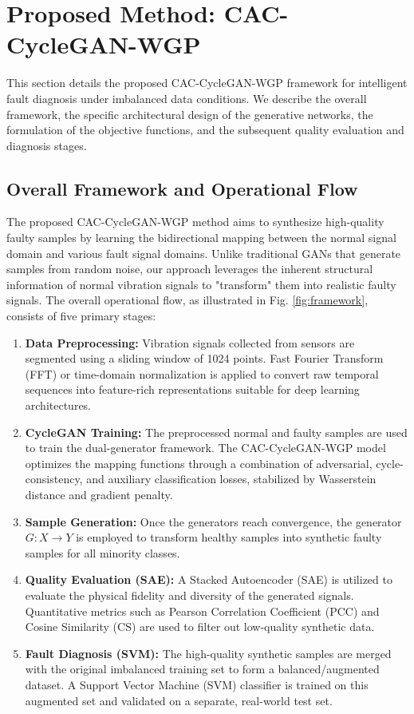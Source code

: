 \section{Proposed Method: CAC-CycleGAN-WGP}
\label{sec:proposed_method}

This section details the proposed CAC-CycleGAN-WGP framework for intelligent fault diagnosis under imbalanced data conditions. We describe the overall framework, the specific architectural design of the generative networks, the formulation of the objective functions, and the subsequent quality evaluation and diagnosis stages.

\subsection{Overall Framework and Operational Flow}
The proposed CAC-CycleGAN-WGP method aims to synthesize high-quality faulty samples by learning the bidirectional mapping between the normal signal domain and various fault signal domains. Unlike traditional GANs that generate samples from random noise, our approach leverages the inherent structural information of normal vibration signals to "transform" them into realistic faulty signals. The overall operational flow, as illustrated in Fig. \ref{fig:framework}, consists of five primary stages:

\begin{enumerate}
    \item \textbf{Data Preprocessing:} Vibration signals collected from sensors are segmented using a sliding window of 1024 points. Fast Fourier Transform (FFT) or time-domain normalization is applied to convert raw temporal sequences into feature-rich representations suitable for deep learning architectures.
    \item \textbf{CycleGAN Training:} The preprocessed normal and faulty samples are used to train the dual-generator framework. The CAC-CycleGAN-WGP model optimizes the mapping functions through a combination of adversarial, cycle-consistency, and auxiliary classification losses, stabilized by Wasserstein distance and gradient penalty.
    \item \textbf{Sample Generation:} Once the generators reach convergence, the generator $G: X \to Y$ is employed to transform healthy samples into synthetic faulty samples for all minority classes.
    \item \textbf{Quality Evaluation (SAE):} A Stacked Autoencoder (SAE) is utilized to evaluate the physical fidelity and diversity of the generated signals. Quantitative metrics such as Pearson Correlation Coefficient (PCC) and Cosine Similarity (CS) are used to filter out low-quality synthetic data.
    \item \textbf{Fault Diagnosis (SVM):} The high-quality synthetic samples are merged with the original imbalanced training set to form a balanced/augmented dataset. A Support Vector Machine (SVM) classifier is trained on this augmented set and validated on a separate, real-world test set.
\end{enumerate}

